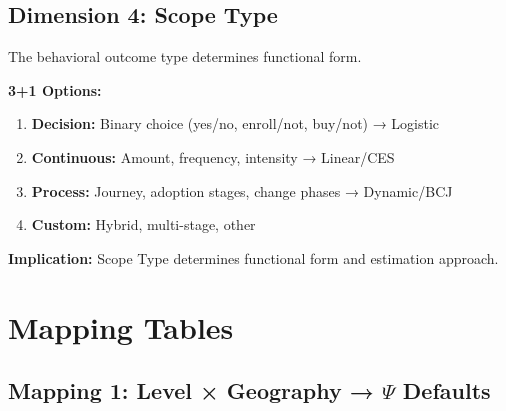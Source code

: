\subsection{Dimension 4: Scope Type}

The behavioral outcome type determines functional form.

\begin{tcolorbox}[colback=white, colframe=black,
    title=Dimension 4: Scope Type Selection]
\textbf{3+1 Options:}
\begin{enumerate}
\item[$\square$] \textbf{Decision:} Binary choice (yes/no, enroll/not, buy/not) → Logistic
\item[$\square$] \textbf{Continuous:} Amount, frequency, intensity → Linear/CES
\item[$\square$] \textbf{Process:} Journey, adoption stages, change phases → Dynamic/BCJ
\item[$\square$] \textbf{Custom:} Hybrid, multi-stage, other
\end{enumerate}

\textbf{Implication:} Scope Type determines functional form and estimation approach.
\end{tcolorbox}


\section{Mapping Tables}
\label{sec:ggg-mappings}

\subsection{Mapping 1: Level × Geography → $\Psi$ Defaults}

